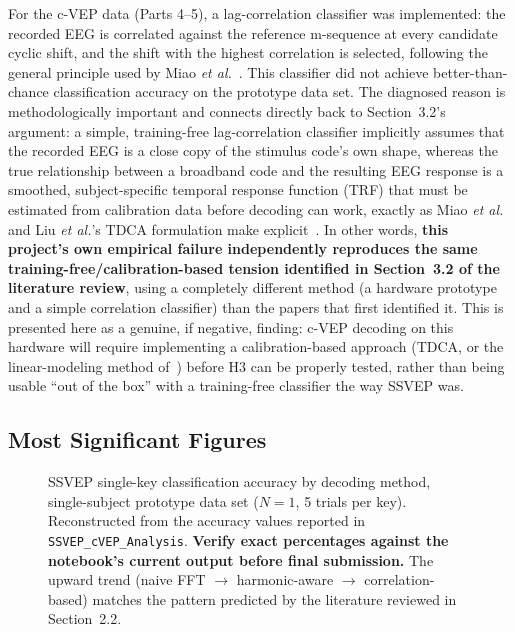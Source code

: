 \documentclass[11pt]{article}
\begin{document}
For the c-VEP data (Parts 4--5), a lag-correlation classifier was implemented: the recorded EEG is correlated against the reference m-sequence at every candidate cyclic shift, and the shift with the highest correlation is selected, following the general principle used by Miao \textit{et al.}~\cite{miao2024cvepminimal}. This classifier did not achieve better-than-chance classification accuracy on the prototype data set. The diagnosed reason is methodologically important and connects directly back to Section~3.2's argument: a simple, training-free lag-correlation classifier implicitly assumes that the recorded EEG is a close copy of the stimulus code's own shape, whereas the true relationship between a broadband code and the resulting EEG response is a smoothed, subject-specific temporal response function (TRF) that must be estimated from calibration data before decoding can work, exactly as Miao \textit{et al.} and Liu \textit{et al.}'s TDCA formulation make explicit~\cite{miao2024cvepminimal,liu2021tdca}. In other words, \textbf{this project's own empirical failure independently reproduces the same training-free/calibration-based tension identified in Section~3.2 of the literature review}, using a completely different method (a hardware prototype and a simple correlation classifier) than the papers that first identified it. This is presented here as a genuine, if negative, finding: c-VEP decoding on this hardware will require implementing a calibration-based approach (TDCA, or the linear-modeling method of~\cite{miao2024cvepminimal}) before H3 can be properly tested, rather than being usable ``out of the box'' with a training-free classifier the way SSVEP was.

\subsection{Most Significant Figures}

\begin{figure}[htbp]
\centering
{}
\caption{SSVEP single-key classification accuracy by decoding method, single-subject prototype data set ($N=1$, 5 trials per key). Reconstructed from the accuracy values reported in \texttt{SSVEP\_cVEP\_Analysis}. \textbf{Verify exact percentages against the notebook's current output before final submission.} The upward trend (naive FFT $\rightarrow$ harmonic-aware $\rightarrow$ correlation-based) matches the pattern predicted by the literature reviewed in Section~2.2.}
\label{fig:ssvep-progression}
\end{figure}
\end{document}
